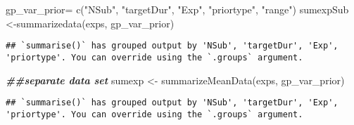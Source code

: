 \documentclass[
]{article}
\newenvironment{Shaded}{\begin{snugshade}}{\end{snugshade}}
\newcommand{\CommentTok}[1]{\textcolor[rgb]{0.56,0.35,0.01}{\textit{#1}}}
\newcommand{\ConstantTok}[1]{\textcolor[rgb]{0.00,0.00,0.00}{#1}}
\newcommand{\DecValTok}[1]{\textcolor[rgb]{0.00,0.00,0.81}{#1}}
\newcommand{\DocumentationTok}[1]{\textcolor[rgb]{0.56,0.35,0.01}{\textbf{\textit{#1}}}}
\newcommand{\FunctionTok}[1]{\textcolor[rgb]{0.00,0.00,0.00}{#1}}
\newcommand{\NormalTok}[1]{#1}
\newcommand{\OtherTok}[1]{\textcolor[rgb]{0.56,0.35,0.01}{#1}}
\newcommand{\SpecialCharTok}[1]{\textcolor[rgb]{0.00,0.00,0.00}{#1}}
\newcommand{\StringTok}[1]{\textcolor[rgb]{0.31,0.60,0.02}{#1}}
\begin{document}
\begin{Shaded}
\end{Shaded}

\begin{Shaded}
\begin{Highlighting}[]
\NormalTok{gp\_var\_prior}\OtherTok{=} \FunctionTok{c}\NormalTok{(}\StringTok{"NSub"}\NormalTok{, }\StringTok{"targetDur"}\NormalTok{, }\StringTok{"Exp"}\NormalTok{, }\StringTok{"priortype"}\NormalTok{, }\StringTok{"range"}\NormalTok{)}
\NormalTok{sumexpSub }\OtherTok{\textless{}{-}}\FunctionTok{summarizedata}\NormalTok{(exps, gp\_var\_prior)}
\end{Highlighting}
\end{Shaded}

\begin{verbatim}
## `summarise()` has grouped output by 'NSub', 'targetDur', 'Exp', 'priortype'. You can override using the `.groups` argument.
\end{verbatim}

\begin{Shaded}
\begin{Highlighting}[]
\DocumentationTok{\#\#separate data set }
\NormalTok{sumexp }\OtherTok{\textless{}{-}} \FunctionTok{summarizeMeanData}\NormalTok{(exps, gp\_var\_prior)}
\end{Highlighting}
\end{Shaded}

\begin{verbatim}
## `summarise()` has grouped output by 'NSub', 'targetDur', 'Exp', 'priortype'. You can override using the `.groups` argument.
\end{verbatim}
\end{document}
